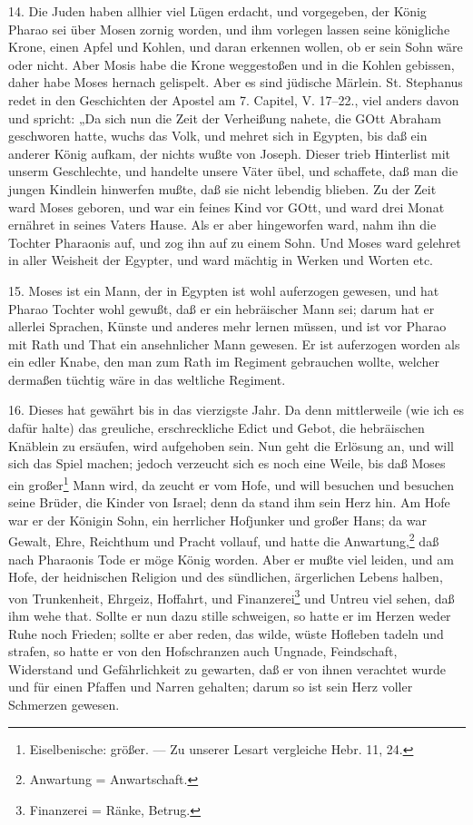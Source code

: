 14. Die Juden haben allhier viel Lügen erdacht, und vorgegeben, der König Pharao sei über Mosen zornig worden, und ihm vorlegen lassen seine königliche Krone, einen Apfel und Kohlen, und daran erkennen wollen, ob er sein Sohn wäre oder nicht. Aber Mosis habe die Krone weggestoßen und in die Kohlen gebissen, daher habe Moses hernach gelispelt. Aber es sind jüdische Märlein. St. Stephanus redet in den Geschichten der Apostel am 7. Capitel, V. 17–22., viel anders davon und spricht: „Da sich nun die Zeit der Verheißung nahete,
die GOtt Abraham geschworen hatte, wuchs das Volk, und mehret sich in Egypten, bis daß ein anderer König aufkam, der nichts wußte von Joseph. Dieser trieb Hinterlist mit unserm Geschlechte, und handelte unsere Väter übel, und schaffete, daß man die jungen Kindlein hinwerfen mußte, daß sie nicht lebendig blieben. Zu der Zeit ward Moses geboren, und war ein feines Kind vor GOtt, und ward drei Monat ernähret in seines Vaters Hause. Als er aber hingeworfen ward, nahm ihn die Tochter Pharaonis auf, und zog ihn auf zu einem Sohn. Und Moses ward gelehret in aller Weisheit der Egypter, und ward mächtig in Werken und Worten etc.

15. Moses ist ein Mann, der in Egypten ist wohl auferzogen gewesen, und hat Pharao Tochter wohl gewußt, daß er ein hebräischer Mann sei; darum hat er allerlei Sprachen, Künste und anderes mehr lernen müssen, und ist vor Pharao mit Rath und That ein ansehnlicher Mann gewesen. Er ist auferzogen worden als ein edler Knabe, den man zum Rath im Regiment gebrauchen wollte, welcher dermaßen tüchtig wäre in das weltliche Regiment.

16. Dieses hat gewährt bis in das vierzigste Jahr. Da denn mittlerweile (wie ich es dafür halte) das greuliche, erschreckliche Edict und Gebot, die hebräischen Knäblein zu ersäufen, wird aufgehoben sein. Nun geht die Erlösung an, und will sich das Spiel machen; jedoch verzeucht sich es noch eine Weile, bis daß Moses ein großer\footnote{Eiselbenische: größer. — Zu unserer Lesart vergleiche Hebr. 11, 24.} Mann wird, da zeucht er vom Hofe, und will besuchen und besuchen seine Brüder, die Kinder von Israel; denn da stand ihm sein Herz hin. Am Hofe war er der Königin Sohn, ein herrlicher Hofjunker und großer Hans; da war Gewalt, Ehre, Reichthum und Pracht vollauf, und hatte die Anwartung,\footnote{Anwartung = Anwartschaft.} daß nach Pharaonis Tode er möge König worden. Aber er mußte viel leiden, und am Hofe, der heidnischen Religion und des sündlichen, ärgerlichen Lebens halben, von Trunkenheit, Ehrgeiz, Hoffahrt, und Finanzerei\footnote{Finanzerei = Ränke, Betrug.} und Untreu viel sehen, daß ihm wehe that. Sollte er nun dazu stille schweigen, so hatte er im Herzen weder Ruhe noch Frieden; sollte er aber reden, das wilde, wüste Hofleben tadeln und strafen, so hatte er von den Hofschranzen auch Ungnade, Feindschaft, Widerstand und Gefährlichkeit zu gewarten, daß er von ihnen verachtet wurde und für einen Pfaffen und Narren gehalten; darum so ist sein Herz voller Schmerzen gewesen.

